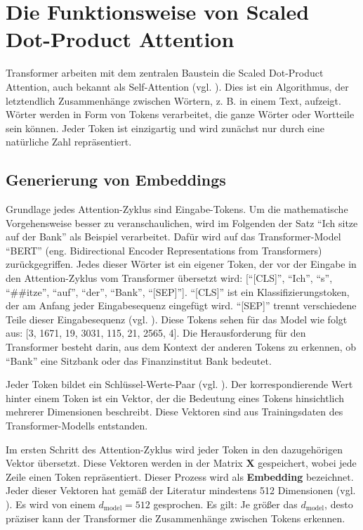 \chapter{Die Funktionsweise von Scaled Dot-Product Attention}

Transformer arbeiten mit dem zentralen Baustein die Scaled Dot-Product Attention, auch bekannt als Self-Attention (vgl. \cite[S. 4]{attention}).
Dies ist ein Algorithmus, der letztendlich Zusammenhänge zwischen Wörtern, z. B. in einem Text, aufzeigt.
Wörter werden in Form von Tokens verarbeitet, die ganze Wörter oder Wortteile sein können.
Jeder Token ist einzigartig und wird zunächst nur durch eine natürliche Zahl repräsentiert.

\section{Generierung von Embeddings}

Grundlage jedes Attention-Zyklus sind Eingabe-Tokens.
Um die mathematische Vorgehensweise besser zu veranschaulichen, wird im Folgenden der Satz \enquote{Ich sitze auf der Bank} als Beispiel verarbeitet.
Dafür wird auf das Transformer-Model \enquote{BERT} (eng. Bidirectional Encoder Representations from Transformers) zurückgegriffen.
Jedes dieser Wörter ist ein eigener Token, der vor der Eingabe in den Attention-Zyklus vom Transformer übersetzt wird:
[\enquote{[CLS]}, \enquote{Ich}, \enquote{s}, \enquote{##itze}, \enquote{auf}, \enquote{der}, \enquote{Bank}, \enquote{[SEP]}].  
\enquote{[CLS]} ist ein Klassifizierungstoken, der am Anfang jeder Eingabesequenz eingefügt wird.
\enquote{[SEP]} trennt verschiedene Teile dieser Eingabesequenz (vgl. \cite[S. 221]{paass.2020}).
Diese Tokens sehen für das Model wie folgt aus: [3, 1671, 19, 3031, 115, 21, 2565, 4].
Die Herausforderung für den Transformer besteht darin, aus dem Kontext der anderen Tokens zu erkennen, ob \enquote{Bank} eine Sitzbank oder das Finanzinstitut Bank bedeutet.

Jeder Token bildet ein Schlüssel-Werte-Paar (vgl. \cite[S. 172]{paass.2020}).
Der korrespondierende Wert hinter einem Token ist ein Vektor, der die Bedeutung eines Tokens hinsichtlich mehrerer Dimensionen beschreibt.  
Diese Vektoren sind aus Trainingsdaten des Transformer-Modells entstanden.

Im ersten Schritt des Attention-Zyklus wird jeder Token in den dazugehörigen Vektor übersetzt.  
Diese Vektoren werden in der Matrix $\mathbf{X}$ gespeichert, wobei jede Zeile einen Token repräsentiert.  
Dieser Prozess wird als \textbf{Embedding} bezeichnet.  
Jeder dieser Vektoren hat gemäß der Literatur mindestens 512 Dimensionen (vgl. \cite[S. 3]{attention}).  
Es wird von einem \( d_{\text{model}} = 512 \) gesprochen.  
Es gilt: Je größer das \( d_{\text{model}} \), desto präziser kann der Transformer die Zusammenhänge zwischen Tokens erkennen.

